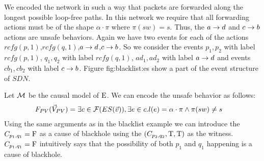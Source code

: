 \begin{example}
    We encoded the network in such a way that packets are forwarded
    along the longest possible loop-free paths.
    In this network
    we require that all forwarding actions must be of the
    shape $\alpha\cdot\pi$ where $\pi(sw) = s$.
    Thus, the $a \rightarrow d$ and $c \rightarrow b$ actions are unsafe behaviors.
    Again we have two events for each of the actions
    $rcfg(p,1)$,$rcfg(q,1)$,$a \rightarrow d$,$c \rightarrow b$.
    So we consider the events $p_1,p_2$ with label $rcfg(p,1)$,
    $q_1,q_2$ with label $rcfg(q,1)$,
    $ad_1,ad_2$ with label $a \rightarrow d$ and events $cb_1,cb_2$
    with label $c\rightarrow b$.
    Figure \refname{fig:blacklist:es} show a part of the event
    structure of $SDN$.
    \begin{figure}
        \centering
        \caption{}
        \label{fig:blackhole:es}
    \end{figure}
    Let $\mathcal{M}$ be the causal model of $\mathrm{E}$.
    We can encode the unsafe behavior as follows:
    \begin{align*}
        F_{PV}(\vec V_{PV}) & = \exists c \in \mathcal{F}(ES(\vec v)),
        \exists e \in c. l(e) =  \alpha\cdot\pi \wedge \pi(sw) \neq s
    \end{align*}
    Using the same arguments as in the blacklist example we can 
    introduce the $C_{p_1,q_1} = \mathrm{F}$ as a cause of blackhole 
    using the $(C_{p_2,q_2},\mathrm{T},\mathrm{T})$ as the witness.
    $C_{p_1,q_1} = \mathrm{F}$ intuitively says that the possibility of
    both $p_1$ and $q_1$ happening is a cause of blackhole.
\end{example}